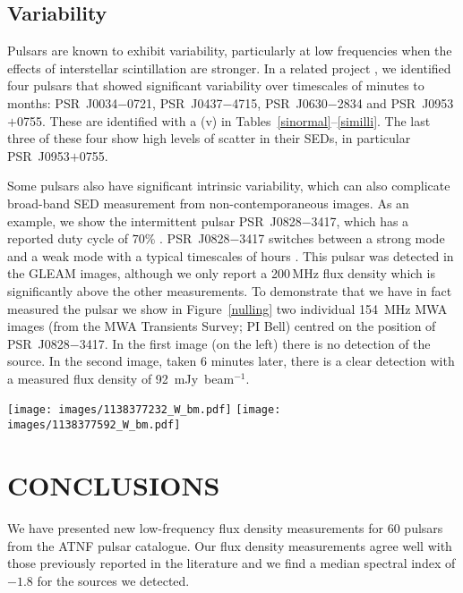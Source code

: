 \documentclass{pasa}%
\begin{document}
\subsection{Variability}\label{s_var}
Pulsars are known to exhibit variability, particularly at low frequencies when the effects of interstellar scintillation are stronger. In a related project \citep{bell16}, we identified four pulsars
that showed significant variability over timescales of minutes to months: PSR~J0034$-$0721, PSR~J0437$-$4715, PSR~J0630$-$2834 and PSR~J0953$+$0755. These are identified with a (v) in Tables~\ref{sinormal}--\ref{similli}. The last three of these four show high levels of scatter in their SEDs, in particular PSR~J0953$+$0755.

Some pulsars also have significant intrinsic variability, which can also complicate broad-band SED measurement from non-contemporaneous images.
As an example, we show the intermittent pulsar PSR~J0828$-$3417, which has a reported duty cycle of $70\%$ \citep{durdin79,biggs85}. 
PSR~J0828$-$3417 switches between a strong mode and a weak mode with a typical timescales of hours \citep{esamdin12}. This pulsar was detected in the GLEAM images, although we only report a 200\,MHz flux density which is significantly above the other measurements.  To demonstrate that we have in fact measured the pulsar we show in Figure~\ref{nulling}  two individual 154~MHz MWA images (from the MWA Transients Survey; PI Bell) centred on the position of PSR~J0828$-$3417. In the first image (on the left) there is no detection of the source. In the second image, taken 6 minutes later, there is a clear detection with a measured flux density of 92~mJy~beam$^{-1}$.

\begin{figure*}
\centering
\texttt{[image: images/1138377232\_W\_bm.pdf]}
\texttt{[image: images/1138377592\_W\_bm.pdf]} 
\vspace*{-1.5cm}
\caption{154~MHz images of PSR~J0828$-$3417 in its off (left) and on 
(right) states in two images from the MWA Transients Survey (MWATS; PI Bell). The two images are separated by 6 minutes: the image on the left was observed at 2016-02-01 15:53:36 UTC, and the image on the right was observed at 2016-02-01 15:59:36 UTC.}
\label{nulling}
\end{figure*}

\section{CONCLUSIONS}\label{s_conclusion}
We have presented new low-frequency flux density measurements for 60 pulsars from the ATNF pulsar catalogue. Our flux density measurements 
agree well with those previously reported in the literature and we find a median spectral index of $-1.8$ for the sources we detected.
\end{document}
